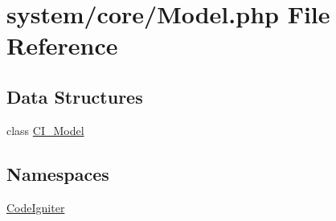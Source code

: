 \hypertarget{_model_8php}{\section{system/core/\-Model.php File Reference}
\label{_model_8php}
}
\subsection*{Data Structures}
\begin{DoxyCompactItemize}
\item 
class \hyperlink{class_c_i___model}{C\-I\-\_\-\-Model}
\end{DoxyCompactItemize}
\subsection*{Namespaces}
\begin{DoxyCompactItemize}
\item 
\hyperlink{namespace_code_igniter}{Code\-Igniter}
\end{DoxyCompactItemize}
